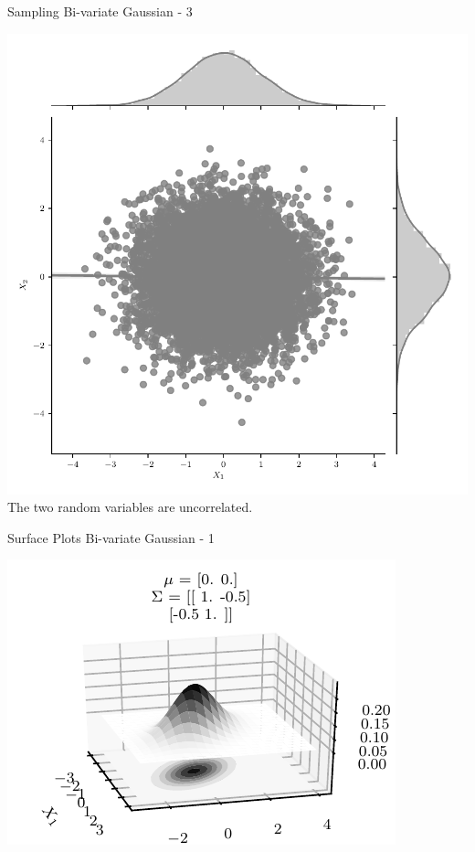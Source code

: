 \documentclass{beamer}
\begin{document}
	\begin{frame}{Sampling Bi-variate Gaussian - 3}
		\begin{center}
			\includegraphics[height=\textheight -30pt ,keepaspectratio]{gp/2d-gp3}\\
			The two random variables are uncorrelated.
		\end{center}
	\end{frame}
	
	\begin{frame}{Surface Plots Bi-variate Gaussian - 1}
		\begin{center}
			\includegraphics[height=\textheight -10pt ,keepaspectratio]{gp/2dgp3d}
		\end{center}
	\end{frame}
	
\end{document}
